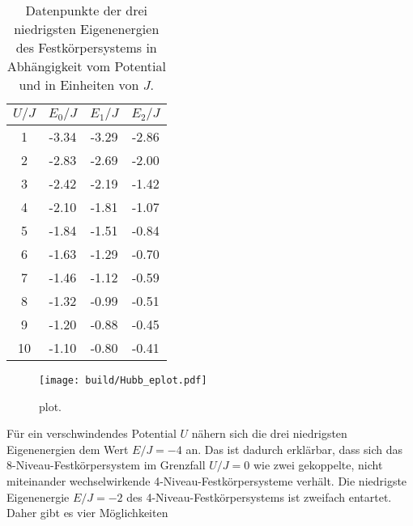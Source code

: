 \begin{table}[h]
  \centering
  \caption{Datenpunkte der drei niedrigsten Eigenenergien des Festkörpersystems in Abhängigkeit vom Potential und in Einheiten von $J$.}
  \begin{tabular}{S[table-format=1.0] S[table-format=2.2] S[table-format=2.2] S[table-format=2.2]}
    \toprule
    {$U/J$} & {$E_0/J$} & {$E_1/J$} & {$E_2/J$} \\
      & -3.34 & -3.29 & -2.86 \\
    2  & -2.83 & -2.69 & -2.00 \\
    3  & -2.42 & -2.19 & -1.42 \\
    4  & -2.10 & -1.81 & -1.07 \\
    5  & -1.84 & -1.51 & -0.84 \\
    6  & -1.63 & -1.29 & -0.70 \\
    7  & -1.46 & -1.12 & -0.59 \\
    8  & -1.32 & -0.99 & -0.51 \\
    9  & -1.20 & -0.88 & -0.45 \\
    10 & -1.10 & -0.80 & -0.41 \\
    \bottomrule
  \end{tabular}
  \label{tab:eigenwerte}
\end{table}

\begin{figure}
  \centering
  \texttt{[image: build/Hubb\_eplot.pdf]}
  \caption{plot.}
  \label{fig:eplot}
\end{figure}

Für ein verschwindendes Potential $U$ nähern sich die drei niedrigsten Eigenenergien dem Wert $E/J = -4$ an.
Das ist dadurch erklärbar, dass sich das 8-Niveau-Festkörpersystem im Grenzfall $U/J = 0$ wie zwei gekoppelte, nicht miteinander wechselwirkende 4-Niveau-Festkörpersysteme verhält.
Die niedrigste Eigenenergie $E/J = -2$ des 4-Niveau-Festkörpersystems   ist zweifach entartet.
Daher gibt es vier Möglichkeiten
